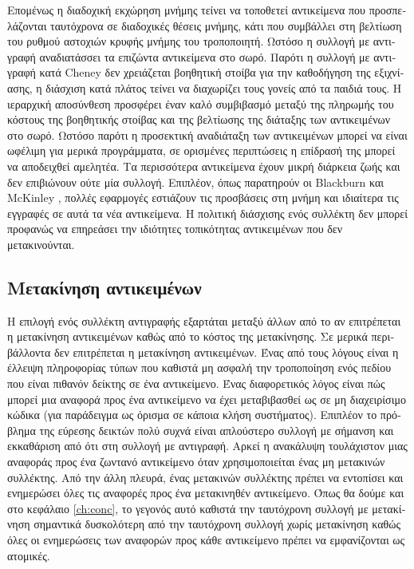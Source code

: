 \begin{greek}
Επομένως η διαδοχική εκχώρηση μνήμης τείνει να τοποθετεί αντικείμενα
που προσπελάζονται ταυτόχρονα σε διαδοχικές θέσεις μνήμης, κάτι
που συμβάλλει στη βελτίωση του ρυθμού αστοχιών κρυφής μνήμης
του τροποποιητή. Ωστόσο η συλλογή με αντιγραφή αναδιατάσσει
τα επιζώντα αντικείμενα στο σωρό. Παρότι η συλλογή με αντιγραφή
κατά Cheney δεν χρειάζεται βοηθητική στοίβα για την καθοδήγηση
της εξιχνίασης, η διάσχιση κατά πλάτος τείνει να διαχωρίζει τους
γονείς από τα παιδιά τους. Η ιεραρχική αποσύνθεση προσφέρει
έναν καλό συμβιβασμό μεταξύ της πληρωμής του κόστους της βοηθητικής 
στοίβας και της βελτίωσης της διάταξης των αντικειμένων στο σωρό.
Ωστόσο παρότι η προσεκτική αναδιάταξη των αντικειμένων μπορεί
να είναι ωφέλιμη για μερικά προγράμματα, σε ορισμένες περιπτώσεις
η επίδρασή της μπορεί να αποδειχθεί αμελητέα. Τα περισσότερα
αντικείμενα έχουν μικρή διάρκεια ζωής και δεν επιβιώνουν ούτε
μία συλλογή. Επιπλέον, όπως παρατηρούν οι Blackburn και McKinley
\cite{DBLP:conf/oopsla/BlackburnM03}, πολλές εφαρμογές εστιάζουν τις προσβάσεις στη μνήμη και
ιδιαίτερα τις εγγραφές σε αυτά τα νέα αντικείμενα. Η πολιτική
διάσχισης ενός συλλέκτη δεν μπορεί προφανώς να επηρεάσει την
ιδιότητες τοπικότητας αντικειμένων που δεν μετακινούνται.

\subsection{Μετακίνηση αντικειμένων}
Η επιλογή ενός συλλέκτη αντιγραφής εξαρτάται μεταξύ άλλων από το
αν επιτρέπεται η μετακίνηση αντικειμένων καθώς από το κόστος της
μετακίνησης. Σε μερικά περιβάλλοντα δεν επιτρέπεται η μετακίνηση
αντικειμένων. Ένας από τους λόγους είναι η έλλειψη πληροφορίας
τύπων που καθιστά μη ασφαλή την τροποποίηση ενός πεδίου που είναι
πιθανόν δείκτης σε ένα αντικείμενο. Ένας διαφορετικός λόγος είναι
πώς μπορεί μια αναφορά προς ένα αντικείμενο να έχει μεταβιβασθεί 
ως σε μη διαχειρίσιμο κώδικα (για παράδειγμα ως όρισμα σε κάποια
κλήση συστήματος). Επιπλέον το πρόβλημα της εύρεσης δεικτών πολύ
συχνά είναι απλούστερο συλλογή με σήμανση και εκκαθάριση από ότι
στη συλλογή με αντιγραφή. Αρκεί η ανακάλυψη τουλάχιστον μιας
αναφοράς προς ένα ζωντανό αντικείμενο όταν χρησιμοποιείται ένας
μη μετακινών συλλέκτης. Από την άλλη πλευρά, ένας μετακινών
συλλέκτης πρέπει να εντοπίσει και ενημερώσει όλες τις αναφορές
προς ένα μετακινηθέν αντικείμενο. Όπως θα δούμε και στο κεφάλαιο
\ref{ch:conc}, το γεγονός αυτό καθιστά την ταυτόχρονη συλλογή
με μετακίνηση σημαντικά δυσκολότερη από την ταυτόχρονη συλλογή 
χωρίς μετακίνηση καθώς όλες οι ενημερώσεις των αναφορών προς
κάθε αντικείμενο πρέπει να εμφανίζονται ως ατομικές.


\end{greek}
